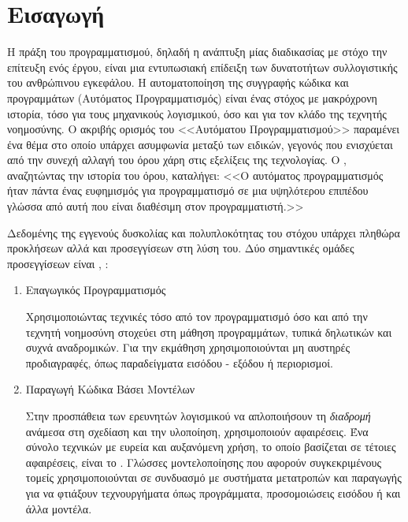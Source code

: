 \chapter{Εισαγωγή}

Η πράξη του προγραμματισμού, δηλαδή η ανάπτυξη μίας διαδικασίας με στόχο την επίτευξη ενός έργου, είναι μια εντυπωσιακή επίδειξη των δυνατοτήτων συλλογιστικής του ανθρώπινου εγκεφάλου.
Η αυτοματοποίηση της συγγραφής κώδικα και προγραμμάτων (Αυτόματος Προγραμματισμός) είναι ένας στόχος με μακρόχρονη ιστορία, τόσο για τους μηχανικούς λογισμικού, όσο και για τον κλάδο της τεχνητής νοημοσύνης.
Ο ακριβής ορισμός του <<Αυτόματου Προγραμματισμού>> παραμένει ένα θέμα στο οποίο υπάρχει ασυμφωνία μεταξύ των ειδικών, γεγονός που ενισχύεται από την συνεχή αλλαγή του όρου χάρη στις εξελίξεις της τεχνολογίας.
Ο , αναζητώντας την ιστορία του όρου, καταλήγει: <<Ο αυτόματος προγραμματισμός ήταν πάντα ένας ευφημισμός για προγραμματισμό σε μια υψηλότερου επιπέδου γλώσσα από αυτή που είναι διαθέσιμη στον προγραμματιστή.>> \cite{Parnas1985}

Δεδομένης της εγγενούς δυσκολίας και πολυπλοκότητας του στόχου υπάρχει πληθώρα προκλήσεων αλλά και προσεγγίσεων στη λύση του.
Δύο σημαντικές ομάδες προσεγγίσεων είναι \cite{Biermann1985}, \cite{Schmidt2006}:

\begin{enumerate}
\item Επαγωγικός Προγραμματισμός  

Χρησιμοποιώντας τεχνικές τόσο από τον προγραμματισμό όσο και από την τεχνητή νοημοσύνη στοχεύει στη μάθηση προγραμμάτων, τυπικά δηλωτικών και συχνά αναδρομικών.
Για την εκμάθηση χρησιμοποιούνται μη αυστηρές προδιαγραφές, όπως παραδείγματα εισόδου - εξόδου ή περιορισμοί.
\item Παραγωγή Κώδικα Βάσει Μοντέλων 

Στην προσπάθεια των ερευνητών λογισμικού να απλοποιήσουν τη \textit{διαδρομή} ανάμεσα στη σχεδίαση και την υλοποίηση, χρησιμοποιούν αφαιρέσεις.
Ένα σύνολο τεχνικών με ευρεία και αυξανόμενη χρήση, το οποίο βασίζεται σε τέτοιες αφαιρέσεις, είναι το .
Γλώσσες μοντελοποίησης που αφορούν συγκεκριμένους τομείς  χρησιμοποιούνται σε συνδυασμό με συστήματα μετατροπών και παραγωγής  για να φτιάξουν τεχνουργήματα όπως προγράμματα, προσομοιώσεις εισόδου ή και άλλα μοντέλα. 
\end{enumerate}

